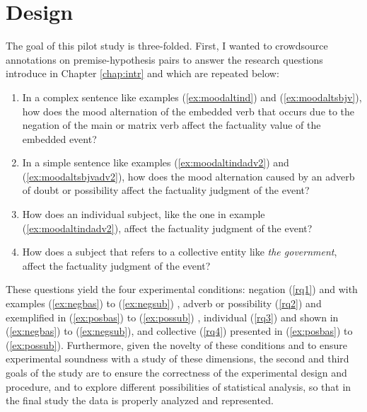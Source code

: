 \label{chap:pil}
\section{Design}
\label{sect:expdes}
The goal of this pilot study is three-folded. First, I wanted to crowdsource annotations on premise-hypothesis pairs to answer the research questions introduce in Chapter \ref{chap:intr} and which are repeated below:\\
\begin{enumerate}[RQ1.-]
        \item In a complex sentence like examples (\ref{ex:moodaltind}) and (\ref{ex:moodaltsbjv}), how does the mood alternation of the embedded verb that occurs due to the negation of the main or matrix verb affect the factuality value of the embedded event?\label{rq1}
        \item In a simple sentence like examples (\ref{ex:moodaltindadv2}) and (\ref{ex:moodaltsbjvadv2}), how does the mood alternation caused by an adverb of doubt or possibility affect the factuality judgment of the event?\label{rq2}
        \item How does an individual subject, like the one in example (\ref{ex:moodaltindadv2}), affect the factuality judgment of the event?\label{rq3}%
        \item How does a subject that refers to a collective entity like \textit{the government}, affect the factuality judgment of the event?\label{rq4}%
\end{enumerate} 

These questions yield the four experimental conditions: negation (\ref{rq1}) and with examples (\ref{ex:negbas}) to (\ref{ex:negsub}) , adverb or possibility (\ref{rq2}) and exemplified in (\ref{ex:posbas}) to (\ref{ex:possub}) , individual (\ref{rq3}) and shown in (\ref{ex:negbas}) to (\ref{ex:negsub}), and collective (\ref{rq4}) presented in (\ref{ex:posbas}) to (\ref{ex:possub}). Furthermore, given the novelty of these conditions and to ensure experimental soundness with a study of these dimensions, the second and third goals of the study are to ensure the correctness of the experimental design and procedure, and to explore different possibilities of statistical analysis, so that in the final study the data is properly analyzed and represented.\\

